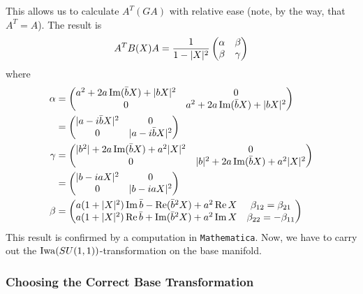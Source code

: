 This allows us to calculate $A^T(GA)$ with relative ease (note, by the way, that $A^T=A$). The result is
\begin{equation*}
	A^TB(X)A=\frac{1}{1-\lvert X \rvert^2}
	\begin{pmatrix}
		\alpha & \beta \\ \beta & \gamma
	\end{pmatrix}
\end{equation*}
where
\begin{align*}
	\alpha &=
	\begin{pmatrix}
		a^2+2a\operatorname{Im} (\bar bX) + \lvert bX \rvert^2 & 0 \\
		0 & a^2+2a\operatorname{Im} (\bar bX) + \lvert bX \rvert^2
	\end{pmatrix} \\
	 &=
	 \begin{pmatrix}
	 	\lvert a-i\bar b X \rvert^2 & 0 \\ 0 & \lvert a-i\bar b X \rvert^2
	 \end{pmatrix}\\
	 \gamma &= 
	\begin{pmatrix}
		\lvert b^2 \rvert+2a\operatorname{Im}(\bar bX) + a^2\lvert X \rvert^2 & 0 \\
		0 & \lvert b \rvert^2+ 2a\operatorname{Im}(\bar bX) + a^2\lvert X \rvert^2
	\end{pmatrix}\\
	&= 
	\begin{pmatrix}
		\lvert b-ia X \rvert^2 & 0 \\ 0 & \lvert b-ia X \rvert^2
	\end{pmatrix}\\
	\beta &=
	\begin{pmatrix}
		 a(1+\lvert X \rvert^2)\operatorname{Im} \bar b -\operatorname{Re}(\bar b^2X)+a^2 \operatorname{Re} X 
		 & \beta_{12}=\beta_{21} \\
		 a(1+\lvert X \rvert^2)\operatorname{Re} \bar b +\operatorname{Im}(\bar b^2X)+a^2\operatorname{Im} X
		 & \beta_{22}=-\beta_{11}
	\end{pmatrix}
\end{align*}
This result is confirmed by a computation in \texttt{Mathematica}. Now, we have to carry out the $\operatorname{Iwa}(SU(1,1))$-transformation on the base manifold.

\subsubsection{Choosing the Correct Base Transformation} 


